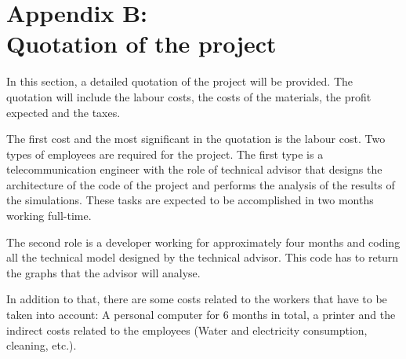 \vspace{\baselineskip}\chapter*{Appendix B: \\ Quotation of the project}
In this section, a detailed quotation of the project will be provided. The quotation will include the labour costs, the costs of the materials, the profit expected and the taxes. \par

The first cost and the most significant in the quotation is the labour cost. Two types of employees are required for the project. The first type is a telecommunication engineer with the role of technical advisor that designs the architecture of the code of the project and performs the analysis of the results of the simulations. These tasks are expected to be accomplished in two months working full-time.\par

The second role is a developer working for approximately four months and coding all the technical model designed by the technical advisor. This code has to return the graphs that the advisor will analyse.\par

In addition to that, there are some costs related to the workers that have to be taken into account: A personal computer for 6 months in total, a printer and the indirect costs related to the employees (Water and electricity consumption, cleaning, etc.). \par


\vspace{\baselineskip}



